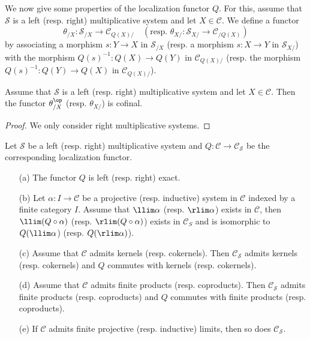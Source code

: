 We now give some properties of the localization functor $Q$. For this, assume that $\mathcal{S}$ is a left (resp. right) multiplicative system and let $X\in\mathcal{C}$. We define a functor
\[\theta_{/X}:\mathcal{S}_{/X}\to\mathcal{C}_{Q(X)/}\quad (\text{resp.\ } \theta_{X/}:\mathcal{S}_{X/}\to\mathcal{C}_{/Q(X)})\]
by associating a morphism $s:Y\to X$ in $\mathcal{S}_{/X}$ (resp. a morphism $s:X\to Y$ in $\mathcal{S}_{X/}$) with the morphism $Q(s)^{-1}:Q(X)\to Q(Y)$ in $\mathcal{C}_{Q(X)/}$ (resp. the morphism $Q(s)^{-1}:Q(Y)\to Q(X)$ in $\mathcal{C}_{Q(X)/}$).

\begin{lemma}\label{category localization functor theta cofinal}
Assume that $\mathcal{S}$ is a left (resp. right) multiplicative system and let $X\in\mathcal{C}$. Then the functor $\theta_{/X}^{\op}$ (resp. $\theta_{X/}$) is cofinal.
\end{lemma}
\begin{proof}
We only consider right multiplicative systems. 
\end{proof}

\begin{proposition}\label{category localization functor exactness prop}
Let $\mathcal{S}$ be a left (resp. right) multiplicative system and $Q:\mathcal{C}\to\mathcal{C}_\mathcal{S}$ be the corresponding localization functor.
\begin{enumerate}
    \item[(a)] The functor $Q$ is left (resp. right) exact.
    \item[(b)] Let $\alpha:I\to\mathcal{C}$ be a projective (resp. inductive) system in $\mathcal{C}$ indexed by a finite category $I$. Assume that $\llim\alpha$ (resp. $\rlim\alpha$) exists in $\mathcal{C}$, then $\llim(Q\circ\alpha)$ (resp. $\rlim(Q\circ\alpha)$) exists in $\mathcal{C}_S$ and is isomorphic to $Q(\llim\alpha$) (resp. $Q(\rlim\alpha)$).
    \item[(c)] Assume that $\mathcal{C}$ admits kernels (resp. cokernels). Then $\mathcal{C}_\mathcal{S}$ admits kernels (resp. cokernels) and $Q$ commutes with kernels (resp. cokernels).
    \item[(d)] Assume that $\mathcal{C}$ admits finite products (resp. coproducts). Then $\mathcal{C}_\mathcal{S}$ admits finite products (resp. coproducts) and $Q$ commutes with finite products (resp. coproducts).
    \item[(e)] If $\mathcal{C}$ admits finite projective (resp. inductive) limits, then so does $\mathcal{C}_\mathcal{S}$.
\end{enumerate}
\end{proposition}

